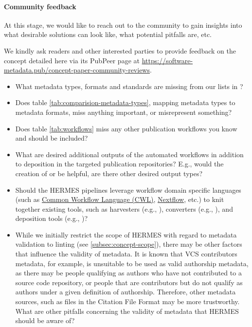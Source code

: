 \documentclass[11pt,a4paper]{scrartcl}
\begin{document}
\begin{tcolorbox}[colback=blue!5!white,colframe=blue!75!black,title=Requesting community feedback]
\paragraph{Community feedback}\label{community-feedback}

At this stage, we would like to reach out to the community to gain insights into what desirable solutions can 
look like, what potential pitfalls are, etc.

We kindly ask readers and other interested parties to provide feedback on the concept detailed here via its PubPeer page at
\url{https://software-metadata.pub/concept-paper-community-reviews}.
\tcblower

\begin{itemize}  
    \item What metadata types, formats and standards are missing from our lists in ?
    \item Does table \ref{tab:comparision-metadata-types}, mapping metadata types to metadata formats, miss anything important, or misrepresent something?
    \item Does table \ref{tab:workflows} miss any other publication workflows you know and should be included?
    \item What are desired additional outputs of the automated workflows in addition to deposition in the targeted
          publication repositories? E.g., would the creation of  or 
           be helpful, are there other desired output types?
    \item Should the HERMES pipelines leverage workflow domain specific languages (such as
          \href{https://www.commonwl.org/}{Common Workflow Language (CWL)}, \href{https://nextflow.io/}{Nextflow}, etc.)
          to knit together existing tools, such as harvesters (e.g., ), 
          converters (e.g., ), and deposition tools (e.g., )?
    \item While we initially restrict the scope of HERMES with regard to metadata validation to linting 
          (see \ref{subsec:concept-scope}), there may be other factors that influence the validity of metadata.
          It is known that VCS contributors metadata, for example, is unsuitable to be used as valid authorship
          metadata, as there may be people qualifying as authors who have not contributed to a source code repository,
          or people that are contributors but do not qualify as authors under a given definition of authorship.
          Therefore, other metadata sources, such as files in the Citation File Format may be more trustworthy.
          What are other pitfalls concerning the validity of metadata that HERMES should be aware of?
\end{itemize}

\end{tcolorbox}
\clearpage
\end{document}
